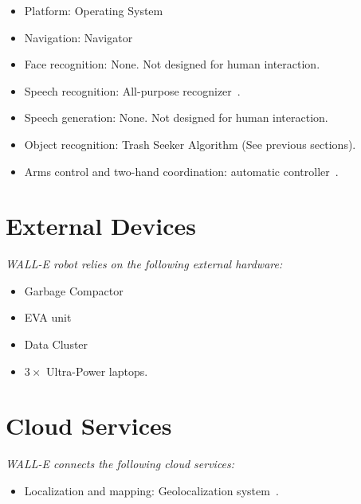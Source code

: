 \begin{itemize}
	\item Platform: Operating System
	\item Navigation: Navigator
	\item Face recognition: None. Not designed for human interaction.
	\item Speech recognition: All-purpose recognizer~\cite{bnl1}.
	\item Speech generation: None. Not designed for human interaction.
	\item Object recognition: Trash Seeker Algorithm (See previous sections).
	\item Arms control and two-hand coordination: automatic controller~\cite{bnl2}.
\end{itemize}

\section*{External Devices}

\textit{WALL-E robot relies on the following external hardware:}

\begin{itemize}
	\item Garbage Compactor
	\item EVA unit
	\item Data Cluster
	\item $3 \times$ Ultra-Power laptops.
\end{itemize}

\section*{Cloud Services}

\textit{WALL-E connects the following cloud services:}
\begin{itemize}
	\item Localization and mapping: Geolocalization system~\cite{bnl3}.
\end{itemize}